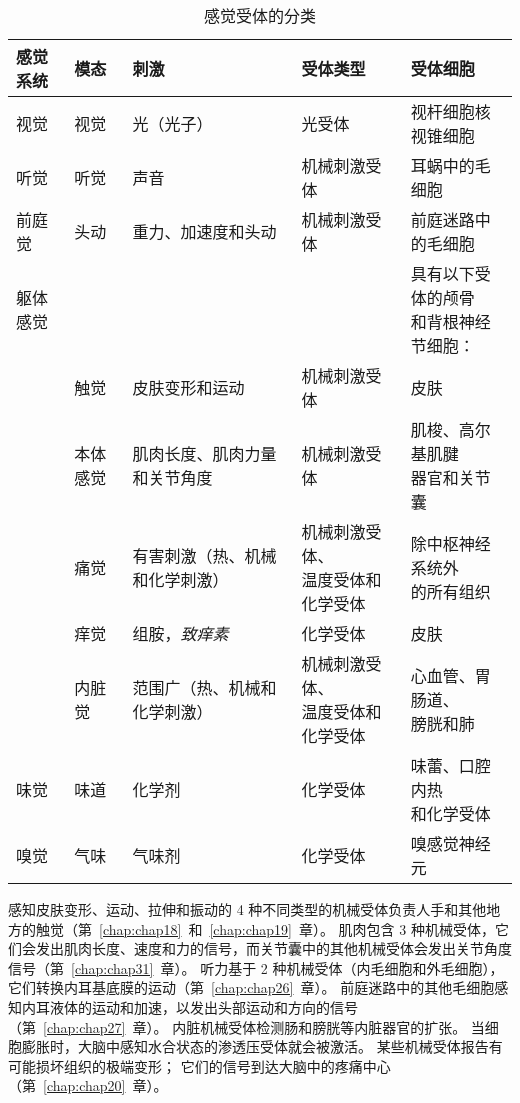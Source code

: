 \begin{table}[htbp]
	\centering
	\caption{感觉受体的分类}
	\begin{tabular}{lllll}
		\toprule
		感觉系统 & 模态 & 刺激 & 受体类型 & 受体细胞 \\
		\midrule
		视觉 & 视觉 & 光（光子）   & 光受体 & 视杆细胞核视锥细胞\\
		听觉 & 听觉 & 声音   & 机械刺激受体 & 耳蜗中的毛细胞 \\
		前庭觉 & 头动 & 重力、加速度和头动   & 机械刺激受体 & 前庭迷路中的毛细胞 \\
		躯体感觉 &  &   &  & \makecell[l]{具有以下受体的颅骨 \\ 和背根神经节细胞：} \\
		 & 触觉 & 皮肤变形和运动   & 机械刺激受体 & 皮肤 \\
		 & 本体感觉 & 肌肉长度、肌肉力量和关节角度   & 机械刺激受体 & \makecell[l]{肌梭、高尔基肌腱 \\ 器官和关节囊}  \\
		 & 痛觉 & 有害刺激（热、机械和化学刺激）  & \makecell[l]{机械刺激受体、 \\ 温度受体和化学受体}  & \makecell[l]{除中枢神经系统外 \\ 的所有组织}  \\
		 & 痒觉 & 组胺，\textit{致痒素}  & 化学受体 & 皮肤 \\
		 & 内脏觉 & 范围广（热、机械和化学刺激）  & \makecell[l]{机械刺激受体、 \\ 温度受体和化学受体} & \makecell[l]{心血管、胃肠道、 \\ 膀胱和肺}  \\
		味觉 & 味道 & 化学剂   & 化学受体 & \makecell[l]{味蕾、口腔内热 \\ 和化学受体}  \\
		嗅觉 & 气味 & 气味剂   & 化学受体 & 嗅感觉神经元 \\
		\bottomrule
	\end{tabular}%
	\label{tab:17_1}%
\end{table}%


感知皮肤变形、运动、拉伸和振动的 4 种不同类型的机械受体负责人手和其他地方的触觉（第~\ref{chap:chap18}~和~\ref{chap:chap19}~章）。
肌肉包含 3 种机械受体，它们会发出肌肉长度、速度和力的信号，而关节囊中的其他机械受体会发出关节角度信号（第~\ref{chap:chap31}~章）。
听力基于 2 种机械受体（内毛细胞和外毛细胞），它们转换内耳基底膜的运动（第~\ref{chap:chap26}~章）。
前庭迷路中的其他毛细胞感知内耳液体的运动和加速，以发出头部运动和方向的信号（第~\ref{chap:chap27}~章）。 
内脏机械受体检测肠和膀胱等内脏器官的扩张。 
当细胞膨胀时，大脑中感知水合状态的渗透压受体就会被激活。 
某些机械受体报告有可能损坏组织的极端变形； 
它们的信号到达大脑中的疼痛中心（第~\ref{chap:chap20}~章）。


